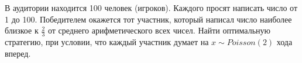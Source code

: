 \begin{problem}
В аудитории находится 100 человек (игроков). Каждого просят написать  число от 1 до 100. Победителем окажется тот участник, который написал число наиболее близкое к $\frac{2}{3}$ от среднего арифметического всех чисел. Найти оптимальную стратегию, при условии, что каждый участник думает на $x \sim Poisson(2)$  хода  вперед.  
\end{problem}

 \begin{comment}
\begin{problem}[сублинейный приближенный вероятностный алгоритм для 
матричных игр; Григориадис -- Хачиян, 1995]
Рассматривается симметричная 
антагонистическая игра двух лиц X и Y. Смешанные стратегии X и Y будем 
обозначать соответственно $\vec {x}$ и $\vec {y}$. При этом $x_k $ - 
вероятность того, что игрок X выберет стратегию с номером k, аналогично 
определяется $y_k $. Таким образом, $\vec {x},\vec {y}\in S=\left\{ {\vec 
{x}\in {\rm R}^n:\;\;\vec {e}^T\vec {x}=1,\;\vec {x}\ge \vec {0}} \right\}$, 
где $\vec {e}=\left( {1,...,1} \right)^T$. Выигрыш игрока X: $V_X \left( 
{\vec {x},\vec {y}} \right)=\vec {y}^TA\vec {x}$, а выигрыш игрока Y: $V_Y 
\left( {\vec {x},\vec {y}} \right)=-\vec {y}^TA\vec {x}$ (игра 
антагонистическая). Каждый игрок стремится максимизировать свой выигрыш, при 
заданном ходе оппонента. Равновесием Нэша (в смешанных стратегиях) 
называется такая пара стратегий $\left( {\vec {x}^\ast ,\;\vec {y}^\ast } 
\right)$, что
\[
\vec {x}^\ast \in \mbox{Arg}\mathop {\max }\limits_{\vec {x}\in S} \vec 
{y}^{\ast T} A\vec {x},
\quad
\vec {y}^\ast \in \mbox{Arg}\mathop {\min }\limits_{\vec {y}\in S} \vec 
{y}^TA\vec {x}^\ast .
\]
Ценой игры называют $\mathop {\max }\limits_{\vec {x}\in S} \mathop {\min 
}\limits_{\vec {y}\in S} \vec {y}^TA\vec {x}=\mathop {\min }\limits_{\vec 
{y}\in S} \mathop {\max }\limits_{\vec {x}\in S} \vec {y}^TA\vec {x}=\vec 
{y}^{\ast T}A\vec {x}^\ast $. Поскольку, по условию, игра также симметричная, 
то $A=-A^T$ - матрица$n\times n$. С помощью стандартной редукции можно 
свести к этому случаю общий случай произвольной матричной игры. В 
рассматриваемом же случае цена игры (выигрыш игроков в положении равновесия 
Нэша) есть 0, а множества оптимальных стратегий игроков совпадают. Требуется 
найти с точностью $\varepsilon >0$ положение равновесия Нэша (оптимальную 
стратегию), т.е. требуется найти такой вектор $\vec {x}$, что $A\vec {x}\le 
\varepsilon \vec {e}$, $\vec {x}\in S$. Покажите, считая элементы матрицы 
$A$ равномерно ограниченными, скажем, единицей, что приводимый ниже алгоритм 

\end{comment}
